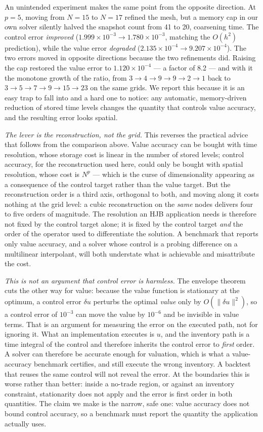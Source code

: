 \documentclass[conference]{IEEEtran}
\begin{document}
An unintended experiment makes the same point from the opposite direction. At $p=5$, moving from
$N=15$ to $N=17$ refined the mesh, but a memory cap in our own solver silently halved the
snapshot count from 41 to 20, coarsening time. The control error \emph{improved}
($1.999\times10^{-3} \to 1.780\times10^{-3}$, matching the $O(h^2)$ prediction), while the value
error \emph{degraded} ($2.135\times10^{-4} \to 9.207\times10^{-4}$). The two errors moved in
opposite directions because the two refinements did. Raising the cap restored the value error to
$1.120\times10^{-4}$ --- a factor of 8.2 --- and with it the monotone growth of the ratio, from
$3 \to 4 \to 9 \to 9 \to 2 \to 1$ back to $3 \to 5 \to 7 \to 9 \to 15 \to 23$ on the same grids.
We report this because it is an easy trap to fall into and a hard one to notice: any automatic,
memory-driven reduction of stored time levels changes the quantity that controls value accuracy,
and the resulting error looks spatial.

\emph{The lever is the reconstruction, not the grid.} This reverses the practical advice that
follows from the comparison above. Value accuracy can be bought with time resolution, whose
storage cost is linear in the number of stored levels; control accuracy, for the reconstruction
used here, could only be bought with spatial resolution, whose cost is $N^p$ --- which is the
curse of dimensionality appearing as a consequence of the control target rather than the value
target. But the reconstruction order is a third axis, orthogonal to both, and moving along it
costs nothing at the grid level: a cubic reconstruction on the \emph{same} nodes delivers four to
five orders of magnitude. The resolution an HJB application needs is therefore not fixed by the
control target alone; it is fixed by the control target \emph{and} the order of the operator used
to differentiate the solution. A benchmark that reports only value accuracy, and a solver whose
control is a probing difference on a multilinear interpolant, will both understate what is
achievable and misattribute the cost.

\emph{This is not an argument that control error is harmless.} The envelope theorem cuts the other
way for value: because the value function is stationary at the optimum, a control error $\delta u$
perturbs the optimal \emph{value} only by $O(\|\delta u\|^2)$, so a control error of $10^{-3}$ can
move the value by $10^{-6}$ and be invisible in value terms. That is an argument for measuring the
error on the executed path, not for ignoring it. What an implementation executes is $u$, and the
inventory path is a time integral of the control and therefore inherits the control error to \emph{first}
order. A solver can therefore be accurate enough for valuation, which is what a value-accuracy
benchmark certifies, and still execute the wrong inventory. A backtest that reuses the same
control will not reveal the error. At the boundaries this is worse rather than better: inside a
no-trade region, or against an inventory constraint, stationarity does not apply and the error is
first order in both quantities. The claim we make is the narrow, safe one: value accuracy does
not bound control accuracy, so a benchmark must report the quantity the application actually
uses.
\end{document}
